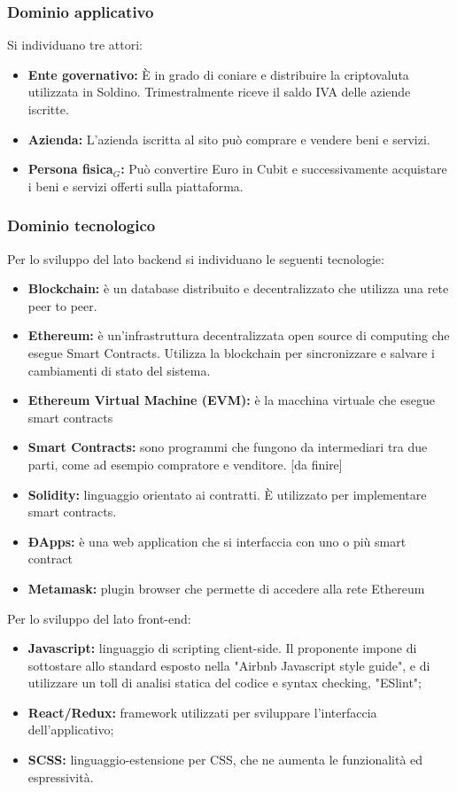 \subsubsection{Dominio applicativo}
Si individuano tre attori:
\begin{itemize}	
	\item \textbf{Ente governativo: }\`E in grado di coniare e distribuire la 
	criptovaluta utilizzata in Soldino. Trimestralmente riceve il saldo IVA 
	delle aziende iscritte.
	\item \textbf{Azienda: } L'azienda iscritta al sito può comprare e vendere 
	beni e servizi. %
	\item \textbf{Persona fisica$_{G}$: }Può convertire Euro in Cubit e successivamente acquistare
	i beni e servizi offerti sulla piattaforma.
\end{itemize}
\subsubsection{Dominio tecnologico}
Per lo sviluppo del lato backend si individuano le seguenti tecnologie:
\begin{itemize}
    \item \textbf{Blockchain: }è un database distribuito e 
    decentralizzato che utilizza una rete peer to peer.
	\item \textbf{Ethereum: }è un'infrastruttura decentralizzata open source di computing che
	esegue Smart Contracts. Utilizza la blockchain per sincronizzare e salvare i cambiamenti di stato
	del sistema.
	\item \textbf{Ethereum Virtual Machine (EVM): }è la macchina virtuale che esegue smart contracts
	\item \textbf{Smart Contracts: } sono programmi che fungono da intermediari tra due parti, come ad esempio
	compratore e venditore. [da finire]
	\item \textbf{Solidity: }linguaggio orientato ai contratti. \`E utilizzato per implementare smart contracts.
	\item \textbf{ÐApps: }è una web application che si interfaccia con uno o più smart contract
	\item \textbf{Metamask: }plugin browser che permette di accedere alla rete Ethereum

\end{itemize}
Per lo sviluppo del lato front-end:
\begin{itemize}
	\item \textbf{Javascript:} linguaggio di scripting client-side. Il proponente impone di sottostare allo standard esposto nella "Airbnb Javascript style guide", e di utilizzare un toll di analisi statica del codice e syntax checking, "ESlint";
	\item \textbf{React/Redux:} framework utilizzati per sviluppare l'interfaccia dell'applicativo;
	\item \textbf{SCSS:} linguaggio-estensione per CSS, che ne aumenta le funzionalità ed espressività.
\end{itemize}


